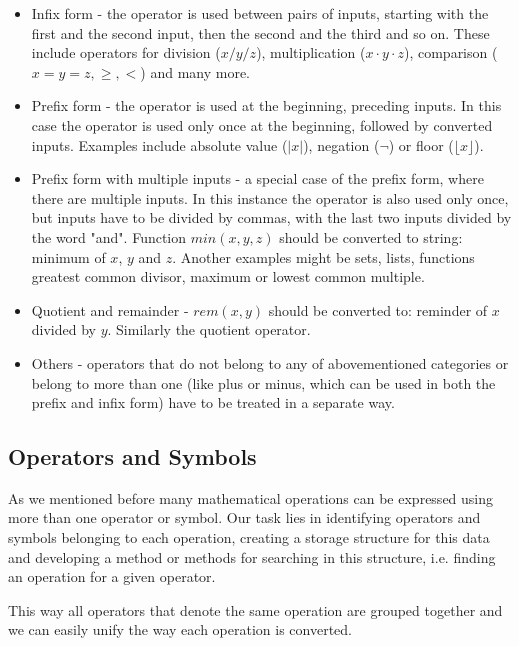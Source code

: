 \documentclass[11pt,oneside,final]{fithesis2}
\begin{document}
\begin{itemize}
\item Infix form - the operator is used between pairs of inputs, starting with the first and the second input, then the second and the third and so on. These include operators for division ($x/y/z$), multiplication ($x\cdot y\cdot z$), comparison ($x=y=z, \geq, <$) and many more.

\item  Prefix form - the operator is used at the beginning, preceding inputs. In this case the operator is used only once at the beginning, followed by converted inputs. Examples include absolute value ($|x|$), negation ($\neg$) or floor ($\lfloor x \rfloor$).

\item Prefix form with multiple inputs - a special case of the prefix form, where there are multiple inputs. In this instance the operator is also used only once, but inputs have to be divided by commas, with the last two inputs divided by the word "and". Function $min(x,y,z)$ should be converted to string: minimum of $x$, $y$ and $z$. Another examples might be sets, lists, functions greatest common divisor, maximum or lowest common multiple.

\item Quotient and remainder - $rem(x,y)$ should be converted to: reminder of $x$ divided by $y$. Similarly the quotient operator.

\item Others - operators that do not belong to any of abovementioned categories or belong to more than one (like plus or minus, which can be used in both the prefix and infix form) have to be treated in a separate way.
\end{itemize}

\subsection{Operators and Symbols}
As we mentioned before many mathematical operations can be expressed using more than one operator or symbol. Our task lies in identifying operators and symbols belonging to each operation, creating a storage structure for this data and developing a method or methods for searching in this structure, i.e. finding an operation for a given operator. 

This way all operators that denote the same operation are grouped together and we can easily unify the way each operation is converted.
\end{document}
